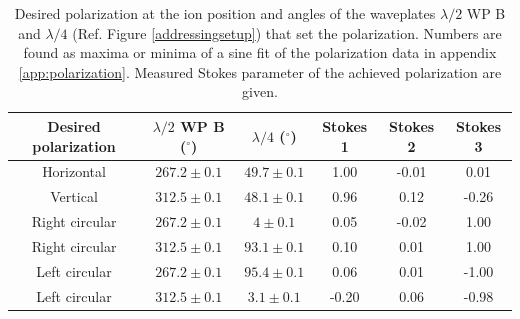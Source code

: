 \begin{table}
\centering
\begin{tabular}{c c c c c c}
 \toprule
    {Desired polarization} & {$\lambda/2$ WP B ($^\circ$)} & {$\lambda/4$ ($^\circ$)} & Stokes 1 & Stokes 2 & Stokes 3\\ \midrule\midrule
   Horizontal & $267.2\pm 0.1$ & $49.7\pm0.1$ & 1.00 & -0.01 & 0.01\\
   Vertical   & $312.5\pm0.1$ & $48.1\pm0.1$ &  0.96 &  0.12 & -0.26 \\ \midrule
   Right circular & $267.2\pm 0.1$ & $4\pm 0.1$ &  0.05 & -0.02 & 1.00 \\
   Right circular & $312.5\pm0.1$ & $93.1\pm0.1$ & 0.10 & 0.01 & 1.00  \\\midrule
  Left circular & $267.2\pm 0.1$ & $95.4\pm0.1$ &  0.06 & 0.01 & -1.00  \\
    Left circular & $312.5\pm0.1$  & $3.1\pm0.1$ &  -0.20 & 0.06 & -0.98  \\ \bottomrule
\end{tabular}
\caption{Desired polarization at the ion position and angles of the waveplates $\lambda/2$ WP B and $\lambda/4$ (Ref. Figure \ref{addressingsetup}) that set the polarization. Numbers are found as maxima or minima of a sine fit of the polarization data in appendix \ref{app:polarization}. Measured Stokes parameter of the achieved polarization are given.}
\label{polarizationstable}
\end{table}

